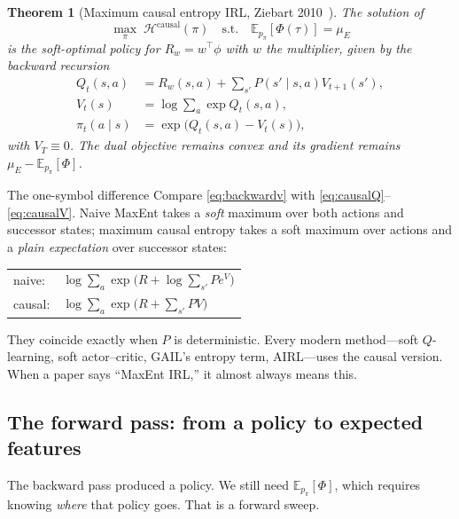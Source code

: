 \documentclass[11pt]{article}
\theoremstyle{plain}
\newtheorem{theorem}{Theorem}[section]
\theoremstyle{definition}
\theoremstyle{remark}
\newcommand{\E}{\mathbb{E}}
\begin{document}
\begin{theorem}[Maximum causal entropy IRL, Ziebart
2010~\cite{ziebart2010thesis}]\label{thm:maxcausal}
The solution of
\begin{equation}
\max_\pi \; \mathcal{H}^{\mathrm{causal}}(\pi) \quad \text{s.t.}\quad
\E_{p_\pi}[\Phi(\tau)] = \mu_E
\label{eq:maxcausalprogram}
\end{equation}
is the soft-optimal policy for $R_w=w^\top\phi$ with $w$ the multiplier,
given by the backward recursion
\begin{align}
Q_t(s,a) &= R_w(s,a) + \sum_{s'} P(s'\mid s,a) V_{t+1}(s'), \label{eq:causalQ}\\
V_t(s) &= \log\sum_a \exp Q_t(s,a), \label{eq:causalV}\\
\pi_t(a\mid s) &= \exp\big(Q_t(s,a) - V_t(s)\big), \label{eq:causalpi}
\end{align}
with $V_T\equiv0$. The dual objective remains convex and its gradient
remains $\mu_E - \E_{p_\pi}[\Phi]$.
\end{theorem}

\begin{graybox}{The one-symbol difference}
Compare \eqref{eq:backwardv} with \eqref{eq:causalQ}--\eqref{eq:causalV}.
Naive MaxEnt takes a \emph{soft} maximum over both actions and successor
states; maximum causal entropy takes a soft maximum over actions and a
\emph{plain expectation} over successor states:
\begin{center}
\begin{tabular}{@{}ll@{}}
naive: & $\log\sum_a \exp\big(R + \log\sum_{s'} P e^V\big)$\\
causal: & $\log\sum_a \exp\big(R + \sum_{s'} P V\big)$
\end{tabular}
\end{center}
They coincide exactly when $P$ is deterministic. Every modern method---soft
$Q$-learning, soft actor--critic, GAIL's entropy term, AIRL---uses the
causal version. When a paper says ``MaxEnt IRL,'' it almost always means
this.
\end{graybox}

\subsection{The forward pass: from a policy to expected features}
\label{sec:forwardpass}

The backward pass produced a policy. We still need $\E_{p_\pi}[\Phi]$,
which requires knowing \emph{where} that policy goes. That is a forward
sweep.
\end{document}
